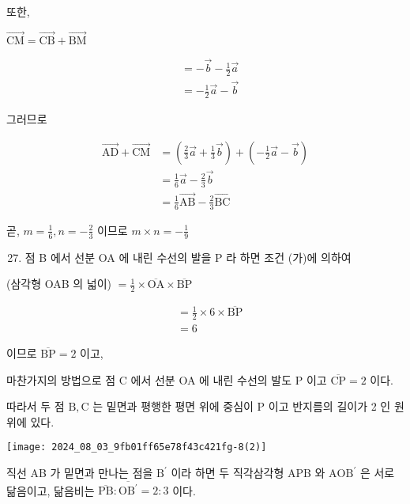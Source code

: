 \documentclass[10pt]{article}
\begin{document}
또한,

\(\overrightarrow{\mathrm{CM}}=\overrightarrow{\mathrm{CB}}+\overrightarrow{\mathrm{BM}}\)

\[
\begin{aligned}
& =-\vec{b}-\frac{1}{2} \vec{a} \\
& =-\frac{1}{2} \vec{a}-\vec{b}
\end{aligned}
\]

그러므로

\[
\begin{aligned}
\overrightarrow{\mathrm{AD}}+\overrightarrow{\mathrm{CM}} & =\left(\frac{2}{3} \vec{a}+\frac{1}{3} \vec{b}\right)+\left(-\frac{1}{2} \vec{a}-\vec{b}\right) \\
& =\frac{1}{6} \vec{a}-\frac{2}{3} \vec{b} \\
& =\frac{1}{6} \overrightarrow{\mathrm{AB}}-\frac{2}{3} \overrightarrow{\mathrm{BC}}
\end{aligned}
\]

곧, \(m=\frac{1}{6}, n=-\frac{2}{3}\) 이므로 \(m \times n=-\frac{1}{9}\)

\begin{enumerate}
  \setcounter{enumi}{26}
  \item 점 B 에서 선분 OA 에 내린 수선의 발을 P 라 하면 조건 (가)에 의하여
\end{enumerate}

(삼각형 OAB 의 넓이) \(=\frac{1}{2} \times \overline{\mathrm{OA}} \times \overline{\mathrm{BP}}\)

\[
\begin{aligned}
& =\frac{1}{2} \times 6 \times \overline{\mathrm{BP}} \\
& =6
\end{aligned}
\]

이므로 \(\overline{\mathrm{BP}}=2\) 이고,

마찬가지의 방법으로 점 C 에서 선분 OA 에 내린 수선의 발도 P 이고 \(\overline{\mathrm{CP}}=2\) 이다.

따라서 두 점 \(\mathrm{B}, \mathrm{C}\) 는 밑면과 평행한 평면 위에 중심이 P 이고 반지름의 길이가 2 인 원 위에 있다.

\begin{center}
\texttt{[image: 2024\_08\_03\_9fb01ff65e78f43c421fg-8(2)]}
\end{center}

직선 AB 가 밑면과 만나는 점을 \(\mathrm{B}^{\prime}\) 이라 하면 두 직각삼각형 APB 와 \(\mathrm{AOB}^{\prime}\) 은 서로 닮음이고, 닮음비는 \(\overline{\mathrm{PB}}: \overline{\mathrm{OB}^{\prime}}=2: 3\) 이다.
\end{document}
